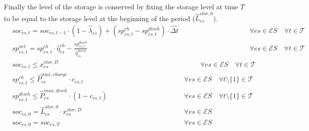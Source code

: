 \documentclass{article}
\newcommand{\cT}{{\mathcal T}}
\newcommand{\cES}{{\mathcal ES}}
\begin{document}
{Finally the level of the storage is conserved by fixing the storage level at time $T$ to be equal to the storage level at the beginning of the period ($\hat{L}_{es}^{stor,0}$). 
		\begin{align}
		& soc_{es,t} = soc_{es,t-1} \cdot (1-\hat{\lambda}_{es}) + (sp_{es,t}^{ch} - sp_{es,t}^{disch}) \cdot \hat{\Delta t}  & \hspace{4cm} \forall es \in \cES \quad \forall t \in \cT \label{eq:Soc}\\
		& sp_{es,t}^{net} = sp_{es,t}^{ch} \cdot \hat{\eta}_{es}^{ch} - \frac{sp_{es,t}^{disch}}{\hat{\eta}_{es}^{disch}} & \hspace{4cm} \forall es \in \cES \quad \forall t \in \cT \label{eq:sp_net}\\
		& soc_{es,t} \leq x_{es}^{stor, D} &\hspace{1cm} \forall es \in \cES \quad \forall t \in \cT \label{eq:Stor_capacity}\\
		& sp_{es,t}^{ch} \leq \hat{P}_{es}^{max, charge} \cdot c_{es,t} & \forall es \in \cES \quad \forall t \setminus\{1\} \in \cT \label{eq:Stor_maxCharge}\\
		& sp_{es,t}^{disch} \leq \hat{P}_{es}^{max, disch} \cdot (1-c_{es,t}) & \forall es \in \cES \quad \forall t \setminus\{1\} \in \cT \label{eq:Stor_maxDisch}\\
		& soc_{es,0} = \hat{L}_{es}^{stor,0} \cdot x_{es}^{stor, D} &\forall es \in \cES \label{eq: Stor_init}\\
		& soc_{es,0} = soc_{es, T} &\forall es \in \cES \label{eq:Stor_boundaries}
		\end{align}
\begin{comment}
		\begin{align}
		& l_{es,t}^{stor} - l_{es,t-1}^{stor} \cdot (1-\hat{\lambda}_{es}) = l_{es,t}^{charge} \cdot \hat{\eta}_{es}^{ch} - l_{es,t}^{disch} \cdot \frac{1}{\hat{\eta}_{es}^{disch}}  & \hspace{4cm} \forall es \in \cES \quad \forall t \in \cT \label{eq:Stor_level}\\
		& l_{es,t}^{stor} \leq x_{es}^{stor, D} &\hspace{1cm} \forall es \in \cES \quad \forall t \in \cT \label{eq:Stor_capacity}\\
		& l_{es,t}^{charge} \leq \hat{P}_{es}^{max, charge} \cdot \Delta t & \forall es \in \cES \quad \forall t \setminus\{1\} \in \cT \label{eq:Stor_maxCharge}\\
		& l_{es,t}^{disch} \leq \hat{P}_{es}^{max, disch} \cdot \Delta t & \forall es \in \cES \quad \forall t \setminus\{1\} \in \cT \label{eq:Stor_maxDisch}\\

\end{comment}}
\end{document}
